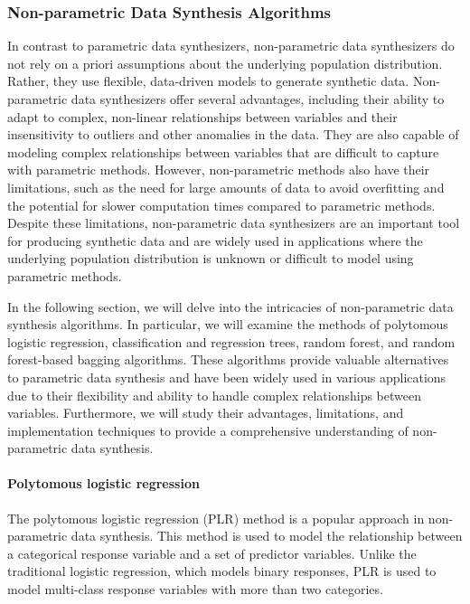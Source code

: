 \subsubsection{Non-parametric Data Synthesis Algorithms}
\label{subsubsec:non-para}
In contrast to parametric data synthesizers, non-parametric data synthesizers do not rely on a priori assumptions about the underlying population distribution. Rather, they use flexible, data-driven models to generate synthetic data. Non-parametric data synthesizers offer several advantages, including their ability to adapt to complex, non-linear relationships between variables and their insensitivity to outliers and other anomalies in the data. They are also capable of modeling complex relationships between variables that are difficult to capture with parametric methods. However, non-parametric methods also have their limitations, such as the need for large amounts of data to avoid overfitting and the potential for slower computation times compared to parametric methods. Despite these limitations, non-parametric data synthesizers are an important tool for producing synthetic data and are widely used in applications where the underlying population distribution is unknown or difficult to model using parametric methods.

In the following section, we will delve into the intricacies of non-parametric data synthesis algorithms. In particular, we will examine the methods of polytomous logistic regression, classification and regression trees, random forest, and random forest-based bagging algorithms. These algorithms provide valuable alternatives to parametric data synthesis and have been widely used in various applications due to their flexibility and ability to handle complex relationships between variables. Furthermore, we will study their advantages, limitations, and implementation techniques to provide a comprehensive understanding of non-parametric data synthesis.

\paragraph{Polytomous logistic regression} The polytomous logistic regression (PLR) method is a popular approach in non-parametric data synthesis. This method is used to model the relationship between a categorical response variable and a set of predictor variables. Unlike the traditional logistic regression, which models binary responses, PLR is used to model multi-class response variables with more than two categories.

